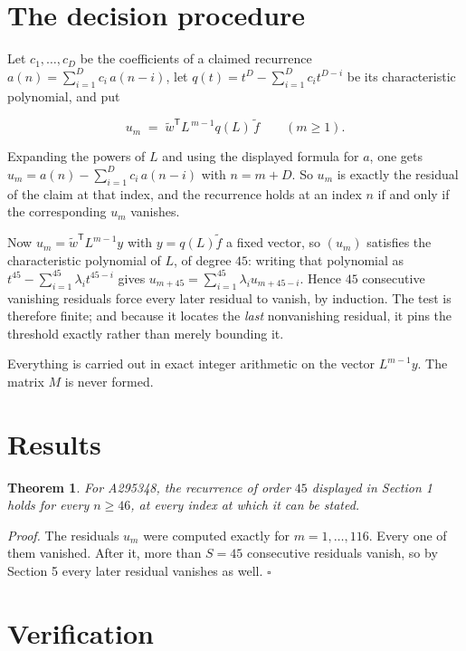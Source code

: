 \documentclass[11pt]{article}
\newtheorem{theorem}{Theorem}
\theoremstyle{definition}
\begin{document}
\section{The decision procedure}

Let $c_1,\dots,c_D$ be the coefficients of a claimed recurrence $a(n) = \sum_{i=1}^{D} c_i\,a(n-i)$, let $q(t) = t^{D} - \sum_{i=1}^{D} c_i t^{D-i}$ be its characteristic polynomial, and put

\[u_m \;=\; \tilde w^{\mathsf T} L^{\,m-1} q(L)\,\tilde f \qquad (m \ge 1).\]

Expanding the powers of $L$ and using the displayed formula for $a$, one gets $u_m = a(n) - \sum_{i=1}^{D} c_i\,a(n-i)$ with $n = m + D$. So $u_m$ is exactly the residual of the claim at that index, and the recurrence holds at an index $n$ if and only if the corresponding $u_m$ vanishes.

Now $u_m = \tilde w^{\mathsf T} L^{m-1} y$ with $y = q(L)\tilde f$ a fixed vector, so $(u_m)$ satisfies the characteristic polynomial of $L$, of degree $45$: writing that polynomial as $t^{45} - \sum_{i=1}^{45} \lambda_i t^{45-i}$ gives $u_{m+45} = \sum_{i=1}^{45} \lambda_i u_{m+45-i}$. Hence $45$ consecutive vanishing residuals force every later residual to vanish, by induction. The test is therefore finite; and because it locates the {\itshape last} nonvanishing residual, it pins the threshold exactly rather than merely bounding it.

Everything is carried out in exact integer arithmetic on the vector $L^{m-1}y$. The matrix $M$ is never formed.

\section{Results}

\begin{theorem} For A295348, the recurrence of order $45$ displayed in Section 1 holds for every $n \ge 46$, at every index at which it can be stated.\end{theorem}

{\itshape Proof.} The residuals $u_m$ were computed exactly for $m = 1,\dots,116$. Every one of them vanished. After it, more than $S = 45$ consecutive residuals vanish, so by Section 5 every later residual vanishes as well. $\square$

\section{Verification}
\end{document}
